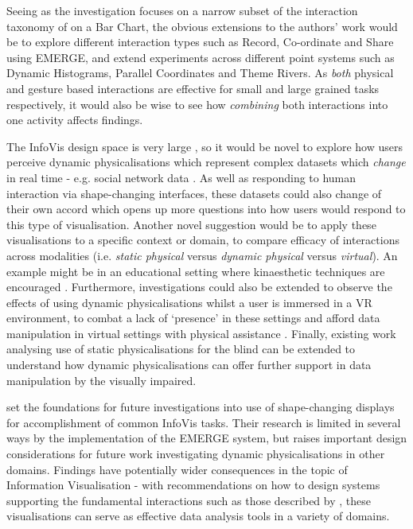 \documentclass[11pt]{article}
\begin{document}
Seeing as the investigation focuses on a narrow subset of the interaction taxonomy of \citet{heer2012} on a Bar Chart, the obvious extensions to the authors' work would be to explore different interaction types such as Record, Co-ordinate and Share using EMERGE, and extend experiments across different point systems such as Dynamic Histograms, Parallel Coordinates and Theme Rivers. As \textit{both} physical and gesture based interactions are effective for small and large grained tasks respectively, it would also be wise to see how \textit{combining} both interactions into one activity affects findings.

The InfoVis design space is very large \citep{card1997}, so it would be novel to explore how users perceive dynamic physicalisations which represent complex datasets which \textit{change} in real time - e.g. social network data \citep{federico2011}. As well as responding to human interaction via shape-changing interfaces, these datasets could also change of their own accord which opens up more questions into how users would respond to this type of visualisation. Another novel suggestion would be to apply these visualisations to a specific context or domain, to compare efficacy of interactions across modalities (i.e. \textit{static physical} versus \textit{dynamic physical} versus \textit{virtual}). An example might be in an educational setting where kinaesthetic techniques are encouraged \citep{gilakjani2011}. Furthermore, investigations could also be extended to observe the effects of using dynamic physicalisations whilst a user is immersed in a VR environment, to combat a lack of `presence' in these settings and afford data manipulation in virtual settings with physical assistance \citep{tennent2017}. Finally, existing work analysing use of static physicalisations for the blind \citep{perkins2002} can be extended to understand how dynamic physicalisations can offer further support in data manipulation by the visually impaired.

\citet{taher2015} set the foundations for future investigations into use of shape-changing displays for accomplishment of common InfoVis tasks. Their research is limited in several ways by the implementation of the EMERGE system, but raises important design considerations for future work investigating dynamic physicalisations in other domains. Findings have potentially wider consequences in the topic of Information Visualisation - with recommendations on how to design systems supporting the fundamental interactions such as those described by \citet{heer2012}, these visualisations can serve as effective data analysis tools in a variety of domains.


\newpage
\small

\normalsize
\end{document}
